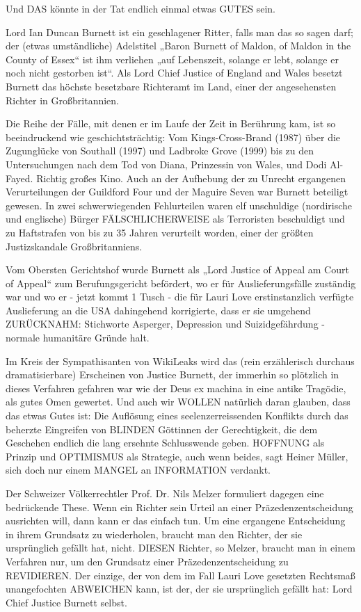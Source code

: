 \begin{multicols}{2}
Und DAS könnte in der Tat endlich einmal etwas GUTES
sein.

Lord Ian Duncan Burnett ist ein geschlagener Ritter, falls
man das so sagen darf; der (etwas umständliche) Adelstitel „Baron Burnett of Maldon, of Maldon in the County of Essex“ ist ihm verliehen „auf Lebenszeit, solange
er lebt, solange er noch nicht gestorben ist“. Als Lord
Chief Justice of England and Wales besetzt Burnett das
höchste besetzbare Richteramt im Land, einer der angesehensten Richter in Großbritannien.

Die Reihe der Fälle, mit denen er im Laufe der Zeit in
Berührung kam, ist so beeindruckend wie geschichtsträchtig: Vom Kings-Cross-Brand (1987) über die Zugunglücke von Southall (1997) und Ladbroke Grove (1999)
bis zu den Untersuchungen nach dem Tod von Diana,
Prinzessin von Wales, und Dodi Al-Fayed. Richtig großes
Kino. Auch an der Aufhebung der zu Unrecht ergangenen Verurteilungen der Guildford Four und der Maguire
Seven war Burnett beteiligt gewesen. In zwei schwerwiegenden Fehlurteilen waren elf unschuldige (nordirische
und englische) Bürger FÄLSCHLICHERWEISE als Terroristen beschuldigt und zu Haftstrafen von bis zu 35 Jahren verurteilt worden, einer der größten Justizskandale
Großbritanniens.

Vom Obersten Gerichtshof wurde Burnett als „Lord Justice of Appeal am Court of Appeal“ zum Berufungsgericht
befördert, wo er für Auslieferungsfälle zuständig war
und wo er - jetzt kommt 1 Tusch - die für Lauri Love erstinstanzlich verfügte Auslieferung an die USA dahingehend korrigierte, dass er sie umgehend ZURÜCKNAHM:
Stichworte Asperger, Depression und Suizidgefährdung
- normale humanitäre Gründe halt.

Im Kreis der Sympathisanten von WikiLeaks wird das
(rein erzählerisch durchaus dramatisierbare) Erscheinen
von Justice Burnett, der immerhin so plötzlich in dieses
Verfahren gefahren war wie der Deus ex machina in eine
antike Tragödie, als gutes Omen gewertet. Und auch wir
WOLLEN natürlich daran glauben, dass das etwas Gutes
ist: Die Auflösung eines seelenzerreissenden Konflikts
durch das beherzte Eingreifen von BLINDEN Göttinnen
der Gerechtigkeit, die dem Geschehen endlich die lang
ersehnte Schlusswende geben. HOFFNUNG als Prinzip
und OPTIMISMUS als Strategie, auch wenn beides, sagt
Heiner Müller, sich doch nur einem MANGEL an INFORMATION verdankt.

Der Schweizer Völkerrechtler Prof. Dr. Nils Melzer formuliert dagegen eine bedrückende These. Wenn ein
Richter sein Urteil an einer Präzedenzentscheidung
ausrichten will, dann kann er das einfach tun. Um eine
ergangene Entscheidung in ihrem Grundsatz zu wiederholen, braucht man den Richter, der sie ursprünglich gefällt hat, nicht. DIESEN Richter, so Melzer, braucht man
in einem Verfahren nur, um den Grundsatz einer Präzedenzentscheidung zu REVIDIEREN. Der einzige, der von
dem im Fall Lauri Love gesetzten Rechtsmaß unangefochten ABWEICHEN kann, ist der, der sie ursprünglich
gefällt hat: Lord Chief Justice Burnett selbst.



\end{multicols}
